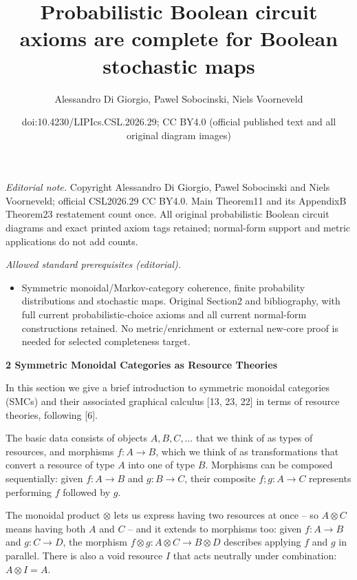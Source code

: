 \documentclass[10pt,a4paper]{article}
\title{Probabilistic Boolean circuit axioms are complete for Boolean stochastic maps}
\author{Alessandro Di Giorgio, Pawel Sobocinski, Niels Voorneveld}
\date{doi:10.4230/LIPIcs.CSL.2026.29; CC BY4.0 (official published text and all original diagram images)}
\begin{document}
\maketitle
\noindent\textit{Editorial note.} Copyright Alessandro Di Giorgio, Pawel Sobocinski and Niels Voorneveld; official CSL2026.29 CC BY4.0. Main Theorem11 and its AppendixB Theorem23 restatement count once. All original probabilistic Boolean circuit diagrams and exact printed axiom tags retained; normal-form support and metric applications do not add counts.\par\medskip
\noindent\textit{Allowed standard prerequisites (editorial).}\begin{itemize}
\item Symmetric monoidal/Markov-category coherence, finite probability distributions and stochastic maps. Original Section2 and bibliography, with full current probabilistic-choice axioms and all current normal-form constructions retained. No metric/enrichment or external new-core proof is needed for selected completeness target.
\end{itemize}\medskip

 
\par\medskip\noindent\textbf{2 Symmetric Monoidal Categories as Resource Theories}\par
 
 
In this section we give a brief introduction to symmetric monoidal categories (SMCs) and their associated graphical calculus [13, 23, 22] in terms of resource theories, following [6].\par
 
 
 
The basic data consists of objects $A,B,C,\ldots$ that we think of as types of resources, and morphisms $f\colon A\to B$, which we think of as transformations that convert a resource of type $A$ into one of type $B$. Morphisms can be composed sequentially: given $f\colon A\to B$ and $g\colon B\to C$, their composite $f;g\colon A\to C$ represents performing $f$ followed by $g$.\par
 
 
 
The monoidal product $\otimes$ lets us express having two resources at once – so $A\otimes C$ means having both $A$ and $C$ – and it extends to morphisms too: given $f\colon A\to B$ and $g\colon C\to D$, the morphism $f\otimes g\colon A\otimes C\to B\otimes D$ describes applying $f$ and $g$ in parallel. There is also a void resource $I$ that acts neutrally under combination: $A\otimes I=A$.\par
 
\end{document}
